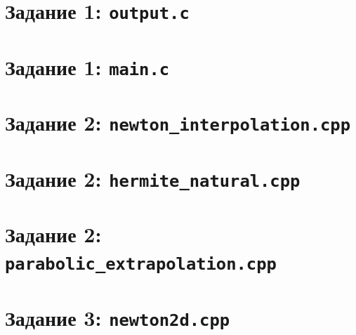 \documentclass[11pt,a4paper]{report}
\begin{document}
\section{Задание 1: \texttt{output.c}}


\section{Задание 1: \texttt{main.c}}


\section{Задание 2: \texttt{newton\_interpolation.cpp}}


\section{Задание 2: \texttt{hermite\_natural.cpp}}


\section{Задание 2: \texttt{parabolic\_extrapolation.cpp}}


\section{Задание 3: \texttt{newton2d.cpp}}

\end{document}
